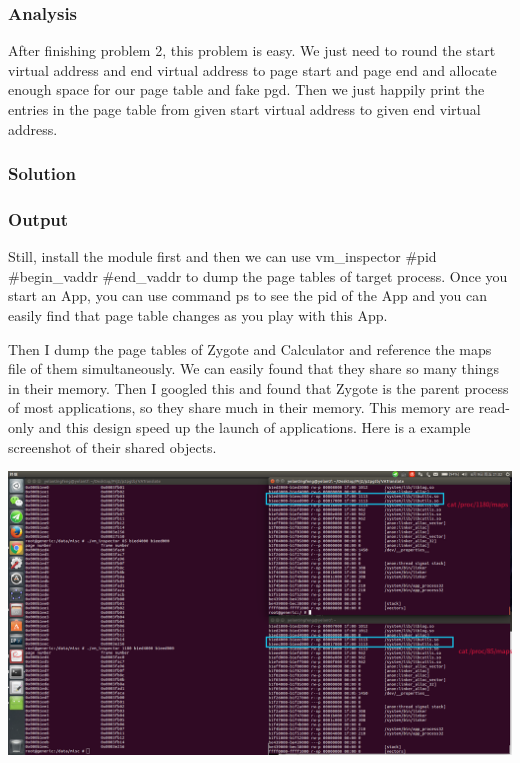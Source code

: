 \documentclass[12pt,a4paper,UTF8]{article}
\theoremstyle{definition}
\numberwithin{equation}{section}
\numberwithin{figure}{section}
\begin{document}
\subsubsection{Analysis}
After finishing problem 2, this problem is easy. We just need to round the start virtual address and end virtual address to page start and page end and allocate enough space for our page table and fake pgd. Then we just happily print the entries in the page table from given start virtual address to given end virtual address.
\subsubsection{Solution}

\subsubsection{Output}
Still, install the module first and then we can use {\color{cyan}\bashfont vm\_inspector \#pid \#begin\_vaddr \#end\_vaddr} to dump the page tables of target process. Once you start an App, you can use command {\color{cyan}\bashfont ps} to see the pid of the App and you can easily find that page table changes as you play with this App.

Then I dump the page tables of Zygote and Calculator and reference the maps file of them simultaneously. We can easily found that they share so many things in their memory. Then I googled this and found that Zygote is the parent process of most applications, so they share much in their memory. This memory are read-only and this design speed up the launch of applications. Here is a example screenshot of their shared objects.

\begin{center}
\includegraphics[scale=0.27]{zygotecommon.png}
\end{center}
\newpage
\end{document}
